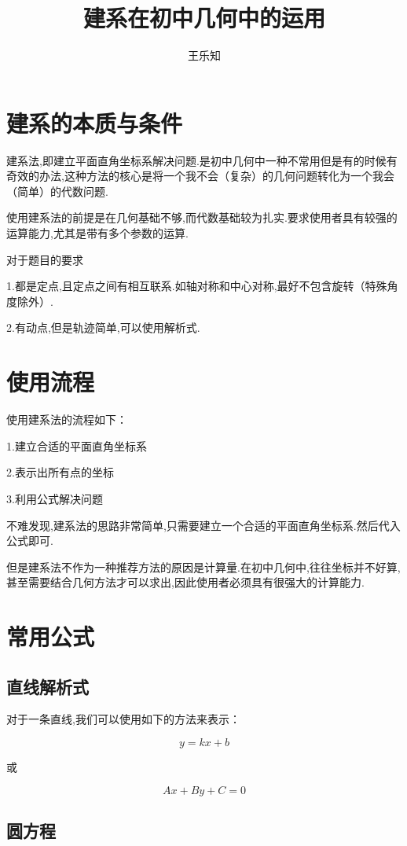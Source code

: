 \documentclass[UTF8,12pt]{ctexart}
\title{建系在初中几何中的运用}
\author{王乐知}
\begin{document}
\maketitle

\section{建系的本质与条件}

建系法,即建立平面直角坐标系解决问题.是初中几何中一种不常用但是有的时候有奇效的办法,这种方法的核心是将一个我不会（复杂）的几何问题转化为一个我会（简单）的代数问题.

使用建系法的前提是在几何基础不够,而代数基础较为扎实.要求使用者具有较强的运算能力,尤其是带有多个参数的运算.

对于题目的要求

1.都是定点,且定点之间有相互联系.如轴对称和中心对称,最好不包含旋转（特殊角度除外）.

2.有动点,但是轨迹简单,可以使用解析式.

\section{使用流程}

使用建系法的流程如下：

1.建立合适的平面直角坐标系

2.表示出所有点的坐标

3.利用公式解决问题

不难发现,建系法的思路非常简单,只需要建立一个合适的平面直角坐标系.然后代入公式即可.

但是建系法不作为一种推荐方法的原因是计算量.在初中几何中,往往坐标并不好算,甚至需要结合几何方法才可以求出,因此使用者必须具有很强大的计算能力.

\section{常用公式}

\subsection{直线解析式}

对于一条直线,我们可以使用如下的方法来表示：

\[
y=kx+b
\]

或

\[
Ax+By+C=0 
\]

\subsection{圆方程}
\end{document}
